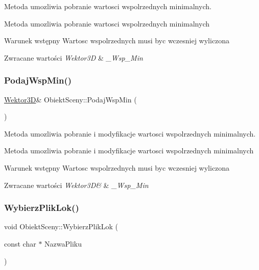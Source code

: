 Metoda umozliwia pobranie wartosci wspolrzednych minimalnych. 

Metoda umozliwia pobranie wartosci wspolrzednych minimalnych \begin{DoxyPrecond}{Warunek wstępny}
Wartosc wspolrzednych musi byc wczesniej wyliczona 
\end{DoxyPrecond}

\begin{DoxyRetVals}{Zwracane wartości}
{\em Wektor3D} & {\itshape \+\_\+\+Wsp\+\_\+\+Min} \\
\hline
\end{DoxyRetVals}
\mbox{\label{classObiektSceny_a2f660e413ae6ed3eb0df7fac9881cf8a}} 
\subsubsection{\texorpdfstring{Podaj\+Wsp\+Min()}{PodajWspMin()}\hspace{0.1cm}{\footnotesize\ttfamily [2/2]}}
{\footnotesize\ttfamily \hyperlink{classSWektor}{Wektor3D}\& Obiekt\+Sceny\+::\+Podaj\+Wsp\+Min (\begin{DoxyParamCaption}{ }\end{DoxyParamCaption})\hspace{0.3cm}{\ttfamily [inline]}}



Metoda umozliwia pobranie i modyfikacje wartosci wspolrzednych minimalnych. 

Metoda umozliwia pobranie i modyfikacje wartosci wspolrzednych minimalnych \begin{DoxyPrecond}{Warunek wstępny}
Wartosc wspolrzednych musi byc wczesniej wyliczona 
\end{DoxyPrecond}

\begin{DoxyRetVals}{Zwracane wartości}
{\em Wektor3\+D\&} & {\itshape \+\_\+\+Wsp\+\_\+\+Min} \\
\hline
\end{DoxyRetVals}
\mbox{\label{classObiektSceny_a84c19442a6a0757a1702e72effbb66d9}} 
\subsubsection{\texorpdfstring{Wybierz\+Plik\+Lok()}{WybierzPlikLok()}}
{\footnotesize\ttfamily void Obiekt\+Sceny\+::\+Wybierz\+Plik\+Lok (\begin{DoxyParamCaption}\item[{const char $\ast$}]{Nazwa\+Pliku }\end{DoxyParamCaption})\hspace{0.3cm}{\ttfamily [inline]}}



